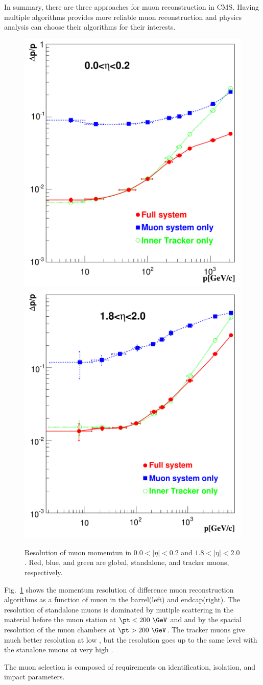 In summary, there are three approaches for muon reconstruction in CMS. 
Having multiple algorithms provides more reliable muon reconstruction 
and physics analysis can choose their algorithms for their interests. 
\begin{figure}[!hbtp]
\centering
\includegraphics[width=.45\textwidth]{figures/Figure_001-005-a.pdf}
\includegraphics[width=.45\textwidth]{figures/Figure_001-005-b.pdf}
\caption{Resolution of muon momemtun in $0.0<|\eta|<0.2$ and $1.8<|\eta|<2.0$. 
Red, blue, and green are global, standalone, and tracker muons, respectively.} 
\label{fig:muon_res}
\end{figure}
Fig.~\ref{fig:muon_res} shows the momentum resolution of difference muon 
reconstruction algorithms as a function of muon \pt in the barrel(left) and endcap(right). 
The resolution of standalone muons is dominated by mutiple scattering in the material 
before the muon station at $\pt<200~\GeV$ and and by the spacial resolution 
of the muon chambers at $\pt>200~\GeV$. The tracker muons give much better 
resolution at low \pt{}, but the resolution goes up to the same level 
with the stanalone muons at very high \pt. 

The muon selection is composed of requirements on identification, isolation, and 
impact parameters.

